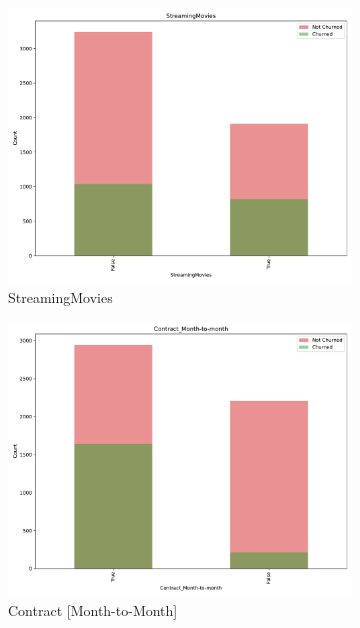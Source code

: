 \documentclass[a4paper,11pt]{article}
\begin{document}
\begin{landscape}
\begin{figure}
    \begin{subfigure}{0.14\linewidth}
        \includegraphics[width=\linewidth]{figures/understanding/StreamingMovies.pdf}
        \caption{StreamingMovies}
    \end{subfigure}
    \begin{subfigure}{0.14\linewidth}
        \includegraphics[width=\linewidth]{figures/understanding/Contract_Month-to-month.pdf}
        \caption{Contract [Month-to-Month]}
    \end{subfigure}
    \begin{subfigure}{0.14\linewidth}

\end{subfigure}
\end{figure}
\end{landscape}
\end{document}
